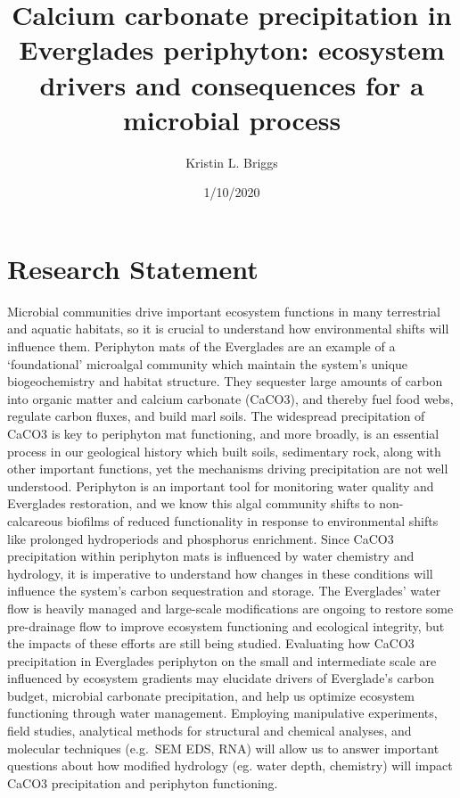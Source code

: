 \documentclass[
]{article}
\title{Calcium carbonate precipitation in Everglades periphyton: ecosystem
drivers and consequences for a microbial process}
\author{Kristin L. Briggs}
\date{1/10/2020}
\begin{document}
\maketitle

\hypertarget{research-statement}{%
\section{Research Statement}\label{research-statement}}

Microbial communities drive important ecosystem functions in many
terrestrial and aquatic habitats, so it is crucial to understand how
environmental shifts will influence them. Periphyton mats of the
Everglades are an example of a `foundational' microalgal community which
maintain the system's unique biogeochemistry and habitat structure. They
sequester large amounts of carbon into organic matter and calcium
carbonate (CaCO3), and thereby fuel food webs, regulate carbon fluxes,
and build marl soils. The widespread precipitation of CaCO3 is key to
periphyton mat functioning, and more broadly, is an essential process in
our geological history which built soils, sedimentary rock, along with
other important functions, yet the mechanisms driving precipitation are
not well understood. Periphyton is an important tool for monitoring
water quality and Everglades restoration, and we know this algal
community shifts to non-calcareous biofilms of reduced functionality in
response to environmental shifts like prolonged hydroperiods and
phosphorus enrichment. Since CaCO3 precipitation within periphyton mats
is influenced by water chemistry and hydrology, it is imperative to
understand how changes in these conditions will influence the system's
carbon sequestration and storage. The Everglades' water flow is heavily
managed and large-scale modifications are ongoing to restore some
pre-drainage flow to improve ecosystem functioning and ecological
integrity, but the impacts of these efforts are still being studied.
Evaluating how CaCO3 precipitation in Everglades periphyton on the small
and intermediate scale are influenced by ecosystem gradients may
elucidate drivers of Everglade's carbon budget, microbial carbonate
precipitation, and help us optimize ecosystem functioning through water
management. Employing manipulative experiments, field studies,
analytical methods for structural and chemical analyses, and molecular
techniques (e.g.~SEM EDS, RNA) will allow us to answer important
questions about how modified hydrology (eg. water depth, chemistry) will
impact CaCO3 precipitation and periphyton functioning.
\end{document}
